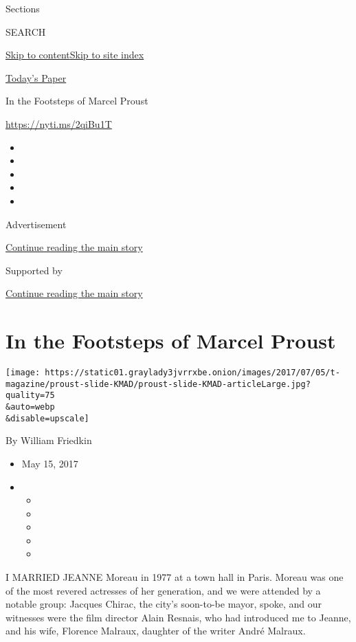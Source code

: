 Sections

SEARCH

\protect\hyperlink{site-content}{Skip to
content}\protect\hyperlink{site-index}{Skip to site index}

\href{https://myaccount.nytimes3xbfgragh.onion/auth/login?response_type=cookie\&client_id=vi}{}

\href{https://www.nytimes3xbfgragh.onion/section/todayspaper}{Today's
Paper}

In the Footsteps of Marcel Proust

\url{https://nyti.ms/2qiBu1T}

\begin{itemize}
\item
\item
\item
\item
\item
\end{itemize}

Advertisement

\protect\hyperlink{after-top}{Continue reading the main story}

Supported by

\protect\hyperlink{after-sponsor}{Continue reading the main story}

\hypertarget{in-the-footsteps-of-marcel-proust}{%
\section{In the Footsteps of Marcel
Proust}\label{in-the-footsteps-of-marcel-proust}}

\texttt{[image: https://static01.graylady3jvrrxbe.onion/images/2017/07/05/t-magazine/proust-slide-KMAD/proust-slide-KMAD-articleLarge.jpg?quality=75\\\&auto=webp\\\&disable=upscale]}

By William Friedkin

\begin{itemize}
\item
  May 15, 2017
\item
  \begin{itemize}
  \item
  \item
  \item
  \item
  \item
  \end{itemize}
\end{itemize}

I MARRIED JEANNE Moreau in 1977 at a town hall in Paris. Moreau was one
of the most revered actresses of her generation, and we were attended by
a notable group: Jacques Chirac, the city's soon-to-be mayor, spoke, and
our witnesses were the film director Alain Resnais, who had introduced
me to Jeanne, and his wife, Florence Malraux, daughter of the writer
André Malraux.

